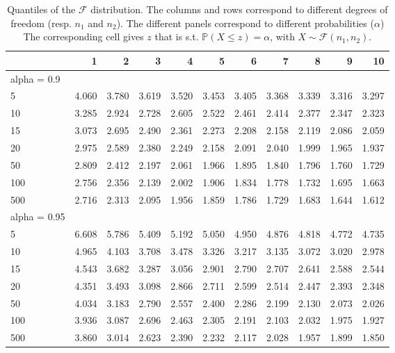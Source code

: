 \documentclass[
  12pt,
]{book}
\theoremstyle{definition}
\theoremstyle{definition}
\theoremstyle{definition}
\theoremstyle{definition}
\theoremstyle{remark}
\begin{document}
\begin{table}

\caption{\label{tab:Fstat}Quantiles of the $\mathcal{F}$ distribution. The columns and rows correspond to different degrees of freedom (resp. $n_1$ and $n_2$). The different panels correspond to different probabilities ($\alpha$) The corresponding cell gives $z$ that is s.t. $\mathbb{P}(X \le z)=\alpha$, with $X \sim \mathcal{F}(n_1,n_2)$.}
\centering
\begin{tabular}[t]{l|r|r|r|r|r|r|r|r|r|r}
\hline
  & 1 & 2 & 3 & 4 & 5 & 6 & 7 & 8 & 9 & 10\\
\hline
alpha = 0.9 &  &  &  &  &  &  &  &  &  & \\
\hline
5 & 4.060 & 3.780 & 3.619 & 3.520 & 3.453 & 3.405 & 3.368 & 3.339 & 3.316 & 3.297\\
\hline
10 & 3.285 & 2.924 & 2.728 & 2.605 & 2.522 & 2.461 & 2.414 & 2.377 & 2.347 & 2.323\\
\hline
15 & 3.073 & 2.695 & 2.490 & 2.361 & 2.273 & 2.208 & 2.158 & 2.119 & 2.086 & 2.059\\
\hline
20 & 2.975 & 2.589 & 2.380 & 2.249 & 2.158 & 2.091 & 2.040 & 1.999 & 1.965 & 1.937\\
\hline
50 & 2.809 & 2.412 & 2.197 & 2.061 & 1.966 & 1.895 & 1.840 & 1.796 & 1.760 & 1.729\\
\hline
100 & 2.756 & 2.356 & 2.139 & 2.002 & 1.906 & 1.834 & 1.778 & 1.732 & 1.695 & 1.663\\
\hline
500 & 2.716 & 2.313 & 2.095 & 1.956 & 1.859 & 1.786 & 1.729 & 1.683 & 1.644 & 1.612\\
\hline
alpha = 0.95 &  &  &  &  &  &  &  &  &  & \\
\hline
5 & 6.608 & 5.786 & 5.409 & 5.192 & 5.050 & 4.950 & 4.876 & 4.818 & 4.772 & 4.735\\
\hline
10 & 4.965 & 4.103 & 3.708 & 3.478 & 3.326 & 3.217 & 3.135 & 3.072 & 3.020 & 2.978\\
\hline
15 & 4.543 & 3.682 & 3.287 & 3.056 & 2.901 & 2.790 & 2.707 & 2.641 & 2.588 & 2.544\\
\hline
20 & 4.351 & 3.493 & 3.098 & 2.866 & 2.711 & 2.599 & 2.514 & 2.447 & 2.393 & 2.348\\
\hline
50 & 4.034 & 3.183 & 2.790 & 2.557 & 2.400 & 2.286 & 2.199 & 2.130 & 2.073 & 2.026\\
\hline
100 & 3.936 & 3.087 & 2.696 & 2.463 & 2.305 & 2.191 & 2.103 & 2.032 & 1.975 & 1.927\\
\hline
500 & 3.860 & 3.014 & 2.623 & 2.390 & 2.232 & 2.117 & 2.028 & 1.957 & 1.899 & 1.850\\

\end{tabular}
\end{table}
\end{document}
